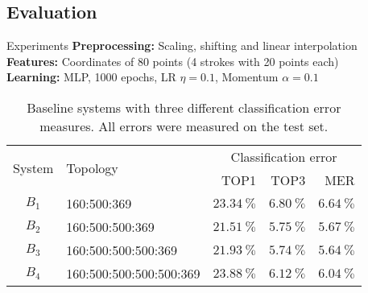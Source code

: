\subsection{Evaluation}
\begin{frame}{Experiments}
    \textbf{Preprocessing:} Scaling, shifting and linear interpolation\\
    \textbf{Features:} Coordinates of 80 points (4 strokes with 20 points each)\\
    \textbf{Learning:} MLP, 1000 epochs, LR $\eta=0.1$, Momentum $\alpha=0.1$
\begin{table}[h]
    \centering
    \begin{tabular}{clrrr}
    \toprule
    \multirow{2}{*}{System}  & \multirow{2}{*}{Topology} & \multicolumn{3}{c}{Classification error}\\ 
          &                         & TOP1                   & TOP3                  & MER \\\midrule
    $B_1$ & 160:500:369             & $\SI{23.34}{\percent}$ & $\SI{6.80}{\percent}$ & $\SI{6.64}{\percent}$ \\
    $B_2$ & 160:500:500:369         & \underline{$\SI{21.51}{\percent}$} & $\SI{5.75}{\percent}$ & $\SI{5.67}{\percent}$ \\
    $B_3$ & 160:500:500:500:369     & $\SI{21.93}{\percent}$ & \underline{$\SI{5.74}{\percent}$} & \underline{$\SI{5.64}{\percent}$} \\
    $B_4$ & 160:500:500:500:500:369 & $\SI{23.88}{\percent}$ & $\SI{6.12}{\percent}$ & $\SI{6.04}{\percent}$ \\
    \bottomrule
    \end{tabular}
    \caption{Baseline systems with three different classification error measures.
             All errors were measured on the test set.}
\label{table:baseline-systems}
\end{table}
\end{frame}

